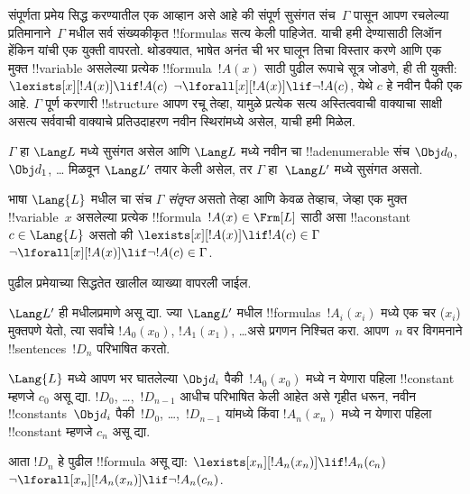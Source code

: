 \documentclass[../../../include/open-logic-section]{subfiles}
\begin{document}


\begin{explain}
संपूर्णता प्रमेय सिद्ध करण्यातील एक आव्हान असे आहे की संपूर्ण सुसंगत
संच~$\Gamma$ पासून आपण रचलेल्या प्रतिमानाने~$\Gamma$ मधील सर्व संख्यकीकृत
!!{formula}s सत्य केली पाहिजेत. याची हमी देण्यासाठी लिऑन हेंकिन यांची एक
युक्ती वापरतो. थोडक्यात, भाषेत अनंत ची भर घालून तिचा विस्तार
करणे आणि एक मुक्त !!{variable} असलेल्या प्रत्येक !!{formula}~$!A(x)$ साठी
पुढील रूपाचे सूत्र जोडणे, ही ती युक्ती:
      {$\lexists[x][!A(x)] \lif !A(c)$}
      {$\lnot\lforall[x][!A(x)] \lif \lnot !A(c)$},
येथे $c$ हे नवीन पैकी एक आहे. $\Gamma$ पूर्ण करणारी
!!{structure} आपण रचू तेव्हा, यामुळे प्रत्येक
{सत्य अस्तित्ववाची वाक्याचा साक्षी}
{असत्य सर्ववाची वाक्याचे प्रतिउदाहरण}
नवीन स्थिरांमध्ये असेल, याची हमी मिळेल.
\end{explain}

\begin{prop}
$\Gamma$ हा $\Lang L$ मध्ये सुसंगत असेल आणि $\Lang L$ मध्ये नवीन
चा !!a{denumerable} संच $\Obj d_0$, $\Obj d_1$, \dots
मिळवून $\Lang L'$ तयार केली असेल, तर $\Gamma$ हा~$\Lang L'$ मध्ये
सुसंगत असतो.
\end{prop}

\begin{defn}[संतृप्त संच]
भाषा $\Lang {L}$ मधील चा संच $\Gamma$
\emph{संतृप्त} असतो तेव्हा आणि केवळ तेव्हाच, जेव्हा एक मुक्त
!!{variable}~$x$ असलेल्या प्रत्येक !!{formula}~$!A(x) \in \Frm[L]$
साठी असा !!a{constant}~$c \in \Lang{L}$ असतो की
      {$\lexists[x][!A(x)] \lif !A(c) \in \Gamma$}
      {$\lnot\lforall[x][!A(x)] \lif \lnot !A(c) \in \Gamma$}.
\end{defn}

पुढील प्रमेयाच्या सिद्धतेत खालील व्याख्या वापरली जाईल.

\begin{defn}
$\Lang L'$ ही  मधीलप्रमाणे असू द्या. ज्या
$\Lang L'$ मधील !!{formula}s~$!A_i(x_i)$ मध्ये एक चर ($x_i$) मुक्तपणे
येतो, त्या सर्वांचे $!A_0(x_0)$, $!A_1(x_1)$, \dots असे प्रगणन निश्चित
करा. आपण~$n$ वर विगमनाने !!{sentence}s~$!D_n$ परिभाषित करतो.

$\Lang{L}$ मध्ये आपण भर घातलेल्या $\Obj d_i$ पैकी~$!A_0(x_0)$ मध्ये
न येणारा पहिला !!{constant} म्हणजे $c_0$ असू द्या. $!D_0$,
\dots,~$!D_{n-1}$ आधीच परिभाषित केली आहेत असे गृहीत धरून, नवीन
!!{constant}s~$\Obj d_i$ पैकी~$!D_0$, \dots,~$!D_{n-1}$ यांमध्ये किंवा
$!A_n(x_n)$ मध्ये न येणारा पहिला !!{constant} म्हणजे $c_n$ असू द्या.

आता $!D_{n}$ हे पुढील !!{formula} असू द्या:
{$\lexists[x_{n}][!A_{n}(x_{n})] \lif
  !A_{n}(c_{n})$}{$\lnot\lforall[x_{n}][!A_{n}(x_{n})] \lif \lnot
  !A_{n}(c_{n})$}.
\end{defn}
\end{document}
